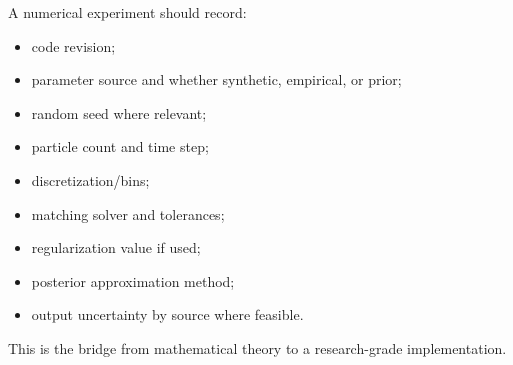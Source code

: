 A numerical experiment should record:

\begin{itemize}
\tightlist
\item
  code revision;
\item
  parameter source and whether synthetic, empirical, or prior;
\item
  random seed where relevant;
\item
  particle count and time step;
\item
  discretization/bins;
\item
  matching solver and tolerances;
\item
  regularization value if used;
\item
  posterior approximation method;
\item
  output uncertainty by source where feasible.
\end{itemize}

This is the bridge from mathematical theory to a research-grade implementation.

